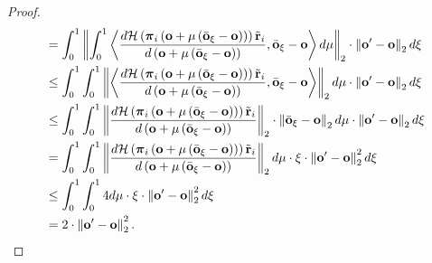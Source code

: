 \documentclass[10pt]{article}
\def\rvo{{\mathbf{o}}}
\def\rvo{{\mathbf{o}}}
\def\rvtilder{{\tilde{\mathbf{r}}}}
\def\rvpi{{\boldsymbol{\pi}}}
\def\gH{{\mathcal{H}}}
\begin{document}
\begin{proof}
\begin{equation*}
\begin{split}
    &= \int_0^1{ \left\| \int_0^1{\left\langle \frac{d \gH \left( \rvpi_i\left( \rvo + \mu\left( \bar{\rvo}_{\xi} - \rvo \right) \right) \right) \rvtilder_i }{d \left( \rvo + \mu\left( \bar{\rvo}_{\xi} - \rvo \right) \right)}, \bar{\rvo}_{\xi} - \rvo \right\rangle d\mu} \right\|_2 \cdot \left\| \rvo^\prime - \rvo \right\|_2 d\xi} \\
    &\le \int_0^1{  \int_0^1{ \left\| \left\langle \frac{d \gH \left( \rvpi_i\left( \rvo + \mu\left( \bar{\rvo}_{\xi} - \rvo \right) \right) \right) \rvtilder_i }{d \left( \rvo + \mu\left( \bar{\rvo}_{\xi} - \rvo \right) \right)}, \bar{\rvo}_{\xi} - \rvo \right\rangle \right\|_2 d\mu} \cdot \left\| \rvo^\prime - \rvo \right\|_2 d\xi} \\
    &\le \int_0^1{  \int_0^1{ \left\| \frac{d \gH \left( \rvpi_i\left( \rvo + \mu\left( \bar{\rvo}_{\xi} - \rvo \right) \right) \right) \rvtilder_i }{d \left( \rvo + \mu\left( \bar{\rvo}_{\xi} - \rvo \right) \right)} \right\|_2 \cdot \left\| \bar{\rvo}_{\xi} - \rvo \right\|_2 d\mu} \cdot \left\| \rvo^\prime - \rvo \right\|_2 d\xi} \\
    &= \int_0^1{  \int_0^1{ \left\| \frac{d \gH \left( \rvpi_i\left( \rvo + \mu\left( \bar{\rvo}_{\xi} - \rvo \right) \right) \right) \rvtilder_i }{d \left( \rvo + \mu\left( \bar{\rvo}_{\xi} - \rvo \right) \right)} \right\|_2 d\mu} \cdot \xi \cdot \left\| \rvo^\prime - \rvo \right\|_2^2 d\xi} \\
    &\le \int_0^1{  \int_0^1{ 4 d\mu} \cdot \xi \cdot \left\| \rvo^\prime - \rvo \right\|_2^2 d\xi} \\
    &= 2 \cdot \left\| \rvo^\prime - \rvo \right\|_2^2. \qedhere
\end{split}
\end{equation*}
\end{proof}
\end{document}
